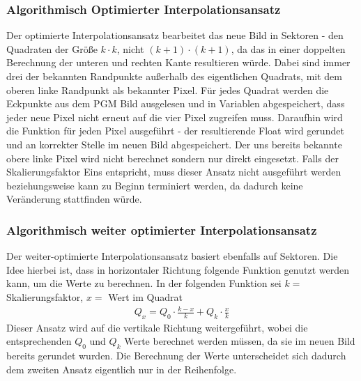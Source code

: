 \documentclass[course=erap]{aspdoc}
\begin{document}
\subsubsection{Algorithmisch Optimierter Interpolationsansatz}
Der optimierte Interpolationsansatz bearbeitet das neue Bild in Sektoren - den Quadraten der Größe $k \cdot k$, nicht $(k+1) \cdot (k+1)$, da das in einer doppelten Berechnung der unteren und rechten Kante resultieren würde. Dabei sind immer drei der bekannten Randpunkte außerhalb des eigentlichen Quadrats, mit dem oberen linke Randpunkt als bekannter Pixel. Für jedes Quadrat werden die Eckpunkte aus dem PGM Bild ausgelesen und in Variablen abgespeichert, dass jeder neue Pixel nicht erneut auf die vier Pixel zugreifen muss. Daraufhin wird die Funktion für jeden Pixel ausgeführt - der resultierende Float wird gerundet und an korrekter Stelle im neuen Bild abgespeichert. Der uns bereits bekannte obere linke Pixel wird nicht berechnet sondern nur direkt eingesetzt. Falls der Skalierungsfaktor Eins entspricht, muss dieser Ansatz nicht ausgeführt werden beziehungsweise kann zu Beginn terminiert werden, da dadurch keine Veränderung stattfinden würde.

\subsubsection{Algorithmisch weiter optimierter Interpolationsansatz}
Der weiter-optimierte Interpolationsansatz basiert ebenfalls auf Sektoren. Die Idee hierbei ist, dass in horizontaler Richtung folgende Funktion genutzt werden kann, um die Werte zu berechnen. In der folgenden Funktion sei $k =$ Skalierungsfaktor, $x =$ Wert im Quadrat
\begin{align}
    Q_{x} {=} Q_{0} \cdot \frac{k-x}{k} + Q_{k} \cdot \frac{x}{k}
\end{align}
Dieser Ansatz wird auf die vertikale Richtung weitergeführt, wobei die entsprechenden $Q_{0}$ und $Q_{k}$ Werte berechnet werden müssen, da sie im neuen Bild bereits gerundet wurden. Die Berechnung der Werte unterscheidet sich dadurch dem zweiten Ansatz eigentlich nur in der Reihenfolge.
\end{document}
